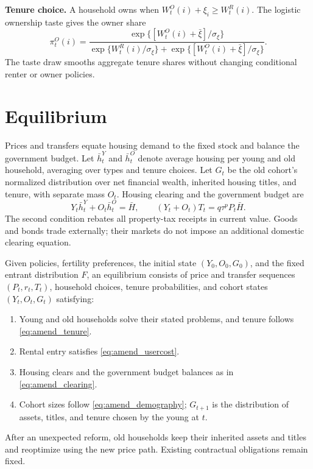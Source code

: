 \textbf{Tenure choice.}
A household owns when $W_t^O(i)+\xi_i\geq W_t^R(i)$. The logistic ownership
taste gives the owner share
\begin{equation}
 \pi_t^O(i)=
 \frac{\exp\{[W_t^O(i)+\bar\xi]/\sigma_\xi\}}
 {\exp\{W_t^R(i)/\sigma_\xi\}+\exp\{[W_t^O(i)+\bar\xi]/\sigma_\xi\}}.
 \label{eq:amend_tenure}
\end{equation}
The taste draw smooths aggregate tenure shares without changing conditional
renter or owner policies.

\section{Equilibrium}

Prices and transfers equate housing demand to the fixed stock and balance the
government budget. Let $\bar h_t^Y$ and $\bar h_t^O$ denote average housing per
young and old household, averaging over types and tenure choices. Let $G_t$
be the old cohort's normalized distribution over net financial wealth,
inherited housing titles, and tenure, with separate mass $O_t$.
Housing clearing and the government budget are
\begin{equation}
 Y_t\bar h_t^Y+O_t\bar h_t^O=\bar H,\qquad
 (Y_t+O_t)T_t=q\tau^p P_t\bar H.
 \label{eq:amend_clearing}
\end{equation}
The second condition rebates all property-tax receipts in current value.
Goods and bonds trade externally; their markets do not impose an additional
domestic clearing equation.

\begin{definition}[Equilibrium]
Given policies, fertility preferences, the initial state $(Y_0,O_0,G_0)$,
and the fixed entrant distribution $F$, an equilibrium consists of price and
transfer sequences $(P_t,r_t,T_t)$, household choices, tenure probabilities,
and cohort states $(Y_t,O_t,G_t)$ satisfying:
\begin{enumerate}[label=(\roman*),nosep,leftmargin=*]
 \item Young and old households solve their stated problems, and tenure
 follows \eqref{eq:amend_tenure}.
 \item Rental entry satisfies \eqref{eq:amend_usercost}.
 \item Housing clears and the government budget balances as in
 \eqref{eq:amend_clearing}.
 \item Cohort sizes follow \eqref{eq:amend_demography}; $G_{t+1}$ is the
 distribution of assets, titles, and tenure chosen by the young at $t$.
\end{enumerate}
After an unexpected reform, old households keep their inherited assets and
titles and reoptimize using the new price path. Existing contractual
obligations remain fixed.
\end{definition}


